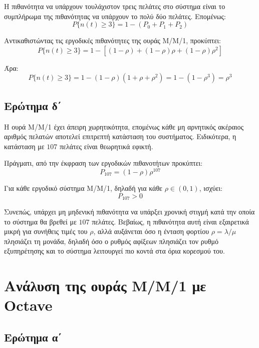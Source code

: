 \documentclass{article}
\begin{document}
Η πιθανότητα να υπάρχουν τουλάχιστον τρεις πελάτες στο σύστημα είναι το
συμπλήρωμα της πιθανότητας να υπάρχουν το πολύ δύο πελάτες. Επομένως:
\begin{equation}
P\{n(t) \geq 3\} = 1 - \left(P_0 + P_1 + P_2\right)
\end{equation}

Αντικαθιστώντας τις εργοδικές πιθανότητες της ουράς Μ/Μ/1, προκύπτει:
\begin{equation}
P\{n(t) \geq 3\}
= 1 - \left[(1-\rho) + (1-\rho)\rho + (1-\rho)\rho^2\right]
\end{equation}

Άρα:
\begin{equation}
P\{n(t) \geq 3\}
= 1 - (1-\rho)(1+\rho+\rho^2)
= 1 - (1-\rho^3)
= \rho^3
\end{equation}

\subsection{Ερώτημα δ΄}

Η ουρά Μ/Μ/1 έχει άπειρη χωρητικότητα, επομένως κάθε μη αρνητικός ακέραιος
αριθμός πελατών αποτελεί επιτρεπτή κατάσταση του συστήματος. Ειδικότερα, η
κατάσταση με $107$ πελάτες είναι θεωρητικά εφικτή.

Πράγματι, από την έκφραση των εργοδικών πιθανοτήτων προκύπτει:
\begin{equation}
P_{107} = (1-\rho)\rho^{107}
\end{equation}

Για κάθε εργοδικό σύστημα Μ/Μ/1, δηλαδή για κάθε $\rho \in (0,1)$, ισχύει:
\begin{equation}
P_{107} > 0
\end{equation}

Συνεπώς, υπάρχει μη μηδενική πιθανότητα να υπάρξει χρονική στιγμή κατά την
οποία το σύστημα θα βρεθεί με $107$ πελάτες. Βεβαίως, η πιθανότητα αυτή είναι
εξαιρετικά μικρή για συνήθεις τιμές του $\rho$, αλλά αυξάνεται όσο η ένταση
φορτίου $\rho = \lambda/\mu$ πλησιάζει τη μονάδα, δηλαδή όσο ο ρυθμός αφίξεων
πλησιάζει τον ρυθμό εξυπηρέτησης και το σύστημα λειτουργεί πιο κοντά στα όρια
κορεσμού του.

\newpage
\section{Ανάλυση της ουράς Μ/Μ/1 με Octave}

\subsection{Ερώτημα α΄}
\end{document}
